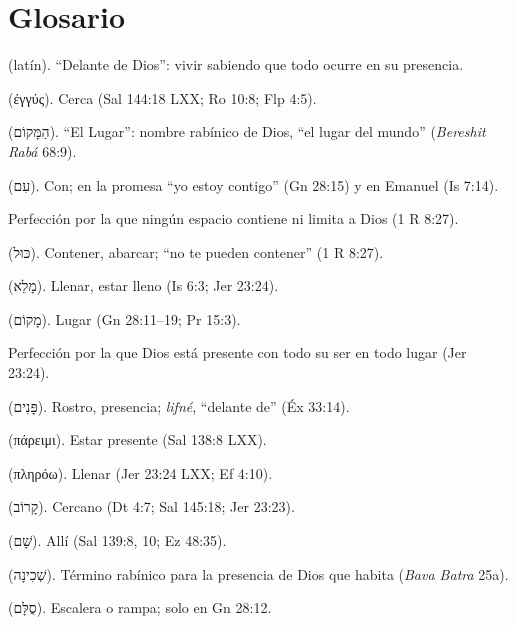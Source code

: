 \documentclass[11pt,letterpaper]{article}
\newcommand{\heb}[1]{\mbox{\foreignlanguage{hebrew}{#1}}}
\newcommand{\grc}[1]{\foreignlanguage{ancientgreek}{#1}}
\begin{document}
\section*{Glosario}
\begin{description}\setlength{\itemsep}{2pt}
\item[\emph{Coram Deo}] (latín). ``Delante de Dios'': vivir sabiendo que todo ocurre en su presencia.
\item[\emph{Engýs}] (\grc{ἐγγύς}). Cerca (Sal 144:18 LXX; Ro 10:8; Flp 4:5).
\item[\emph{HaMaqom}] (\heb{הַמָּקוֹם}). ``El Lugar'': nombre rabínico de Dios, ``el lugar del mundo'' (\emph{Bereshit Rabá} 68:9).
\item[\emph{Im}] (\heb{עִם}). Con; en la promesa ``yo estoy contigo'' (Gn 28:15) y en Emanuel (Is 7:14).
\item[Inmensidad] Perfección por la que ningún espacio contiene ni limita a Dios (1 R 8:27).
\item[\emph{Kul}] (\heb{כּוּל}). Contener, abarcar; ``no te pueden contener'' (1 R 8:27).
\item[\emph{Male'}] (\heb{מָלֵא}). Llenar, estar lleno (Is 6:3; Jer 23:24).
\item[\emph{Maqom}] (\heb{מָקוֹם}). Lugar (Gn 28:11--19; Pr 15:3).
\item[Omnipresencia] Perfección por la que Dios está presente con todo su ser en todo lugar (Jer 23:24).
\item[\emph{Panim}] (\heb{פָּנִים}). Rostro, presencia; \emph{lifné}, ``delante de'' (Éx 33:14).
\item[\emph{Páreimi}] (\grc{πάρειμι}). Estar presente (Sal 138:8 LXX).
\item[\emph{Plēróō}] (\grc{πληρόω}). Llenar (Jer 23:24 LXX; Ef 4:10).
\item[\emph{Qarov}] (\heb{קָרוֹב}). Cercano (Dt 4:7; Sal 145:18; Jer 23:23).
\item[\emph{Sham}] (\heb{שָׁם}). Allí (Sal 139:8, 10; Ez 48:35).
\item[Shejiná] (\heb{שְׁכִינָה}). Término rabínico para la presencia de Dios que habita (\emph{Bava Batra} 25a).
\item[\emph{Sullam}] (\heb{סֻלָּם}). Escalera o rampa; solo en Gn 28:12.
\end{description}
\end{document}
